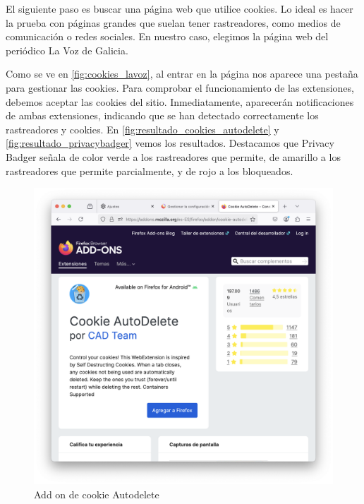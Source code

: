 El siguiente paso es buscar una página web que utilice cookies. Lo ideal es hacer la prueba con páginas grandes que suelan tener rastreadores, como medios de comunicación o redes sociales. En nuestro caso, elegimos la página web del periódico La Voz de Galicia.  

Como se ve en \ref{fig:cookies_lavoz}, al entrar en la página nos aparece una pestaña para gestionar las cookies. Para comprobar el funcionamiento de las extensiones, debemos aceptar las cookies del sitio. Inmediatamente, aparecerán notificaciones de ambas extensiones, indicando que se han detectado correctamente los rastreadores y cookies. En \ref{fig:resultado_cookies_autodelete} y \ref{fig:resultado_privacybadger} vemos los resultados. Destacamos que Privacy Badger señala de color verde a los rastreadores que permite, de amarillo a los rastreadores que permite parcialmente, y de rojo a los bloqueados. 

\begin{figure}[H]   
    \includegraphics[width=15cm]{addon_cookie_autodelete.png}
    \caption{Add on de cookie Autodelete}
    \label{fig:addon_cookie_autodelete}
\end{figure}

